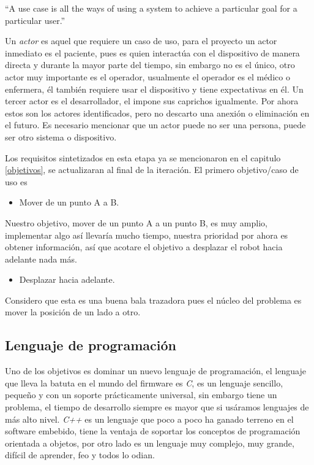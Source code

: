 ``A use case is all the ways of using a system to achieve a particular goal for a particular
user.''\cite{ivar}

Un \emph{actor} es aquel que requiere un caso de uso, para el proyecto un actor
inmediato es el paciente, pues es quien interactúa con el dispositivo de
manera directa y durante la mayor parte del tiempo, sin embargo no es el único,
otro actor muy importante es el operador, usualmente el operador es el médico o
enfermera, él también requiere usar el dispositivo y tiene expectativas en él.
Un tercer actor es el desarrollador, el impone sus caprichos igualmente.
Por ahora estos son los actores identificados, pero no descarto una anexión o 
eliminación en el futuro. Es necesario mencionar que un actor puede no ser 
una persona, puede ser otro sistema o dispositivo.

Los requisitos sintetizados en esta etapa ya se mencionaron en el capitulo 
\ref{objetivos}, se actualizaran al final de la iteración. El primero objetivo/caso
 de uso es

\begin{itemize}
	\item Mover de un punto A a B.
\end{itemize}

Nuestro objetivo, mover de un punto A a un punto B, es muy amplio,
implementar algo así llevaría mucho tiempo, nuestra prioridad por ahora es obtener
información, así que acotare el objetivo a desplazar el robot hacia adelante nada
más.

\begin{itemize}
	\item Desplazar hacia adelante. 
\end{itemize}
Considero que esta es una buena bala trazadora pues el núcleo del problema es 
mover la posición de un lado a otro.

\subsection{Lenguaje de programación}
Uno de los objetivos es dominar un nuevo lenguaje de programación, 
el lenguaje que lleva la batuta en el mundo del
firmware es \emph{C}, es un lenguaje sencillo, pequeño y con un soporte prácticamente
universal, sin embargo tiene un problema, el tiempo de desarrollo siempre es mayor
que si usáramos lenguajes de más alto nivel. \emph{C++} es un lenguaje que poco a poco 
ha ganado terreno en el software embebido, tiene la ventaja de soportar 
los conceptos de programación orientada a objetos, por otro lado es un 
lenguaje muy complejo, muy grande, difícil de aprender, feo y todos lo odian.

